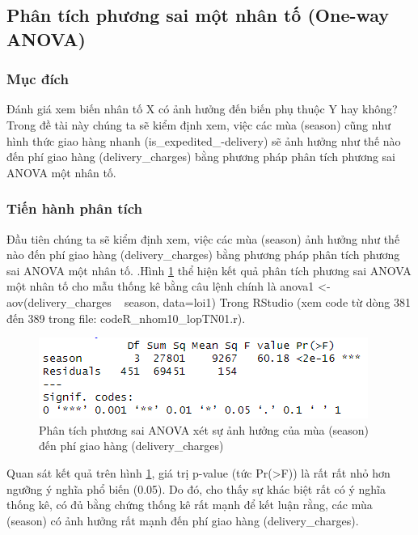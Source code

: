 \subsection{Phân tích phương sai một nhân tố (One-way ANOVA)} \label{anova1}
\subsubsection{Mục đích}
Đánh giá xem biến nhân tố X có ảnh hưởng đến biến phụ thuộc Y hay không? Trong đề tài này chúng ta sẽ kiểm định xem, việc các mùa (season) cũng như hình thức giao hàng nhanh (is\_expedited\_-delivery) sẽ ảnh hưởng như thế nào đến phí giao hàng (delivery\_charges) bằng phương pháp phân tích phương sai ANOVA một nhân tố.
\subsubsection{Tiến hành phân tích}
Đầu tiên chúng ta sẽ kiểm định xem, việc các mùa (season) ảnh hưởng như thế nào đến phí giao hàng (delivery\_charges) bằng phương pháp phân tích phương sai ANOVA một nhân tố. .Hình \ref{fig:5.1} thể hiện kết quả phân tích phương sai ANOVA một nhân tố cho mẫu thống kê bằng câu lệnh chính là anova1 <- aov(delivery\_charges ~ season, data=loi1) Trong RStudio (xem code từ dòng 381 đến 389 trong file: codeR\_nhom10\_lopTN01.r).
\begin{figure}[!htbp]
    \centering
    \includegraphics[width=0.5\linewidth]{graphics/5.3.1.png}
    \caption{Phân tích phương sai ANOVA xét sự ảnh hưởng của mùa (season) đến phí giao hàng (delivery\_charges)}
    \label{fig:5.1}
\end{figure}
Quan sát kết quả trên hình \ref{fig:5.1}, giá trị p-value (tức Pr(>F)) là rất rất nhỏ hơn ngưỡng ý nghĩa phổ biến (0.05). Do đó, cho thấy sự khác biệt rất có ý nghĩa thống kê, có đủ bằng chứng thống kê rất mạnh để kết luận rằng, các mùa (season) có ảnh hưởng rất mạnh đến phí giao hàng (delivery\_charges).

